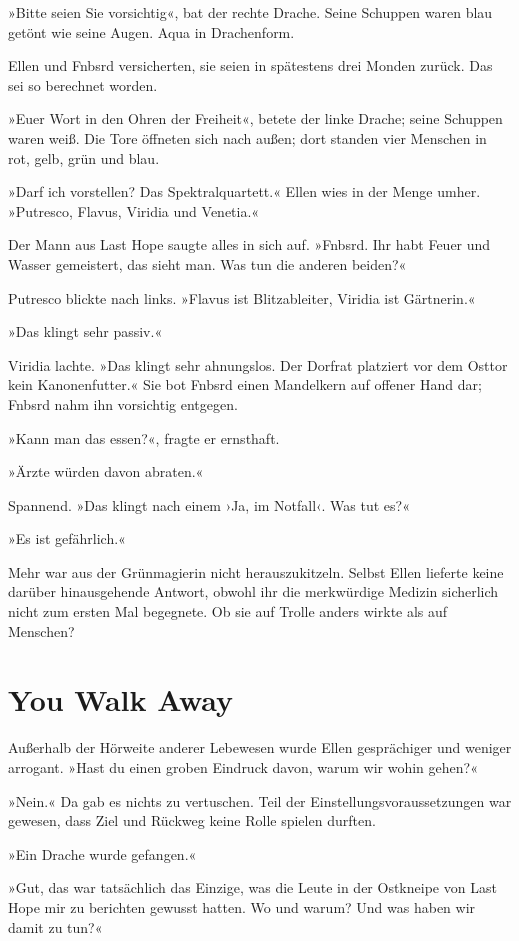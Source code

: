 »Bitte seien Sie vorsichtig«, bat der rechte Drache. Seine Schuppen waren blau getönt wie seine Augen. Aqua in Drachenform.

Ellen und Fnbsrd versicherten, sie seien in spätestens drei Monden zurück. Das sei so berechnet worden.

»Euer Wort in den Ohren der Freiheit«, betete der linke Drache; seine Schuppen waren weiß. Die Tore öffneten sich nach außen; dort standen vier Menschen in rot, gelb, grün und blau.

»Darf ich vorstellen? Das Spektralquartett.« Ellen wies in der Menge umher. »Putresco, Flavus, Viridia und Venetia.«

Der Mann aus Last Hope saugte alles in sich auf. »Fnbsrd. Ihr habt Feuer und Wasser gemeistert, das sieht man. Was tun die anderen beiden?«

Putresco blickte nach links. »Flavus ist Blitzableiter, Viridia ist Gärtnerin.«

»Das klingt sehr passiv.«

Viridia lachte. »Das klingt sehr ahnungslos. Der Dorfrat platziert vor dem Osttor kein Kanonenfutter.« Sie bot Fnbsrd einen Mandelkern auf offener Hand dar; Fnbsrd nahm ihn vorsichtig entgegen.

»Kann man das essen?«, fragte er ernsthaft.

»Ärzte würden davon abraten.«

Spannend. »Das klingt nach einem ›Ja, im Notfall‹. Was tut es?«

»Es ist gefährlich.«

Mehr war aus der Grünmagierin nicht herauszukitzeln. Selbst Ellen lieferte keine darüber hinausgehende Antwort, obwohl ihr die merkwürdige Medizin sicherlich nicht zum ersten Mal begegnete. Ob sie auf Trolle anders wirkte als auf Menschen?


\chapter{You Walk Away}

Außerhalb der Hörweite anderer Lebewesen wurde Ellen gesprächiger und weniger arrogant. »Hast du einen groben Eindruck davon, warum wir wohin gehen?«

»Nein.« Da gab es nichts zu vertuschen. Teil der Einstellungsvoraussetzungen war gewesen, dass Ziel und Rückweg keine Rolle spielen durften.

»Ein Drache wurde gefangen.«

»Gut, das war tatsächlich das Einzige, was die Leute in der Ostkneipe von Last Hope mir zu berichten gewusst hatten. Wo und warum? Und was haben wir damit zu tun?«

